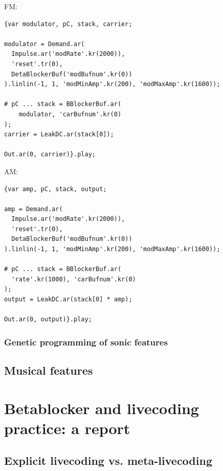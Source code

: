 \documentclass[letterpaper, 12pt]{article}
\begin{document}
FM:
\begin{Verbatim}[fontfamily=courier, xleftmargin=\parindent]
{var modulator, pC, stack, carrier;

modulator = Demand.ar(
  Impulse.ar('modRate'.kr(2000)), 
  'reset'.tr(0),
  DetaBlockerBuf('modBufnum'.kr(0))
).linlin(-1, 1, 'modMinAmp'.kr(200), 'modMaxAmp'.kr(1600));

# pC ... stack = BBlockerBuf.ar(
	modulator, 'carBufnum'.kr(0)
);
carrier = LeakDC.ar(stack[0]);

Out.ar(0, carrier)}.play;
\end{Verbatim}



AM:
\begin{Verbatim}[fontfamily=courier, xleftmargin=\parindent]
{var amp, pC, stack, output;

amp = Demand.ar(
  Impulse.ar('modRate'.kr(2000)), 
  'reset'.tr(0),
  DetaBlockerBuf('modBufnum'.kr(0))
).linlin(-1, 1, 'modMinAmp'.kr(200), 'modMaxAmp'.kr(1600));

# pC ... stack = BBlockerBuf.ar(
  'rate'.kr(1000), 'carBufnum'.kr(0)
);
output = LeakDC.ar(stack[0] * amp);

Out.ar(0, output)}.play;
\end{Verbatim}







\subsubsection{Genetic programming of sonic features} %
\label{sub:genetic_programming_of_sonic_features}


\subsection{Musical features} 
\label{sub:musical_features}



\section{Betablocker and livecoding practice: a report} 
\label{sec:betablocker_and_livecoding_practice_a_report}

\subsection{Explicit livecoding vs. meta-livecoding} 
\label{sub:explicit_livecoding_}
\end{document}
